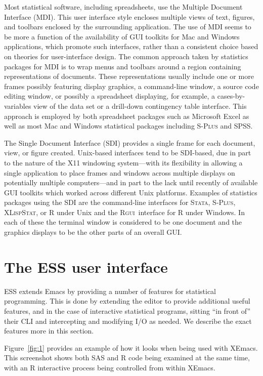 \documentclass{article}
\newcommand*{\Splus}{\textsc{S-Plus}}
\newcommand*{\XLispStat}{\textsc{XLispStat}}
\newcommand*{\Stata}{\textsc{Stata}}
\newcommand*{\Rgui}{\textsc{Rgui}}
\begin{document}
Most statistical software, including spreadsheets, use the Multiple
Document Interface (MDI).  This user interface style encloses multiple
views of text, figures, and toolbars enclosed by the surrounding
application.  The use of MDI seems to be more a function of the
availability of GUI toolkits for Mac and Windows applications, which
promote such interfaces, rather than a consistent choice based on
theories for user-interface design.  The common approach taken by
statistics packages for MDI is to wrap menus and toolbars around a
region containing representations of documents.  These representations
usually include one or more frames possibly featuring display
graphics, a command-line window, a source code editing window, or
possibly a spreadsheet displaying, for example, a cases-by-variables
view of the data set or a drill-down contingency table interface.
This approach is employed by both spreadsheet packages such as
Microsoft Excel as well as most Mac and Windows statistical packages
including \Splus{} and SPSS.

The Single Document Interface (SDI) provides a single frame for each
document, view, or figure created.  Unix-based interfaces tend to be
SDI-based, due in part to the nature of the X11 windowing system---with its
flexibility in allowing a single application to place frames and
windows across multiple displays on potentially multiple computers---and
in part to the lack until recently of available GUI toolkits which
worked across different Unix platforms.  Examples of statistics
packages using the SDI are the command-line interfaces for \Stata,
\Splus, \XLispStat, or R under Unix and the \Rgui\ interface for R
under Windows.  In each of these the terminal window is considered to
be one document and the graphics displays to be the other parts of an
overall GUI.


\section{The ESS user interface}
\label{sec:ESS}

ESS extends Emacs by providing a number of features for statistical
programming.  This is done by extending the editor to provide
additional useful features, and in the case of interactive statistical
programs, sitting ``in front of'' their CLI and intercepting and
modifying I/O as needed.  We describe the exact features more in this
section.  

Figure~\ref{fig:1} provides an example of how it looks when being used
with XEmacs.  This screenshot shows both SAS and R code being examined
at the same time, with an R interactive process being controlled from
within XEmacs.
\end{document}
